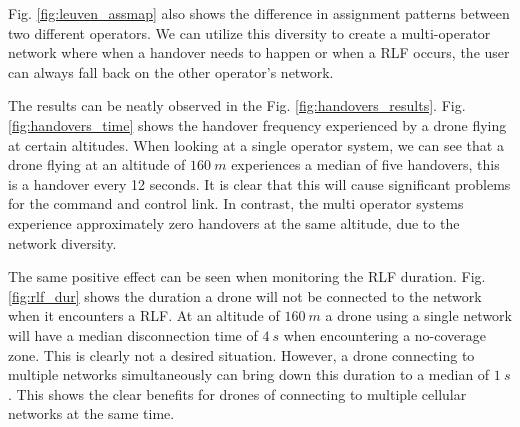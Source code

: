 \documentclass[conference,twocolumn,a4paper]{IEEEtran}
\begin{document}
Fig. \ref{fig:leuven_assmap} also shows the difference in assignment patterns between two different operators. We can utilize this diversity to create a multi-operator network where when a handover needs to happen or when a RLF occurs, the user can always fall back on the other operator's network.


\par The results can be neatly observed in the Fig. \ref{fig:handovers_results}. Fig. \ref{fig:handovers_time} shows the  handover frequency experienced by a drone flying at certain altitudes. When looking at a single operator system, we can see that a drone flying at an altitude of $160~m$ experiences a median of five handovers, this is a handover every 12 seconds. It is clear that this will cause significant problems for the command and control link. In contrast, the multi operator systems experience approximately zero handovers at the same altitude, due to the network diversity.
\par The same positive effect can be seen when monitoring the RLF duration. Fig. \ref{fig:rlf_dur} shows the duration a drone will not be connected to the network when it encounters a RLF. At an altitude of $160~m$ a drone using a single network will have a median disconnection time of $4~s$ when encountering a no-coverage zone. This is clearly not a desired situation. However, a drone connecting to multiple networks simultaneously can bring down this duration to a median of $1~s$. This shows the clear benefits for drones of connecting to multiple cellular networks at the same time.
\end{document}
